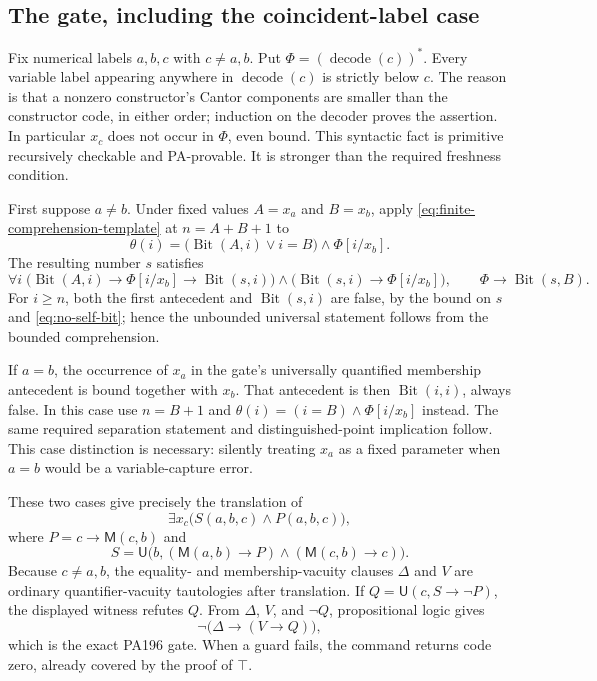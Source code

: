\subsection{The gate, including the coincident-label case}

Fix numerical labels $a,b,c$ with $c\ne a,b$. Put
$\Phi=(\operatorname{decode}(c))^*$. Every variable label appearing
anywhere in $\operatorname{decode}(c)$ is strictly below $c$.
The reason is that a nonzero constructor's Cantor components are smaller
than the constructor code, in either order; induction on the decoder
proves the assertion. In particular $x_c$ does not occur in $\Phi$, even
bound. This syntactic fact is primitive recursively checkable and
PA-provable. It is stronger than the required freshness condition.

First suppose $a\ne b$. Under fixed values $A=x_a$ and $B=x_b$, apply
\eqref{eq:finite-comprehension-template} at $n=A+B+1$ to
\[
  \theta(i)=
  \bigl(\operatorname{Bit}(A,i)\lor i=B\bigr)
  \land \Phi[i/x_b].
\]
The resulting number $s$ satisfies
\[
 \forall i\;
   \bigl(\operatorname{Bit}(A,i)\to\Phi[i/x_b]
                 \to\operatorname{Bit}(s,i)\bigr)
   \land\bigl(\operatorname{Bit}(s,i)\to\Phi[i/x_b]\bigr),
 \qquad
 \Phi\to\operatorname{Bit}(s,B).
\]
For $i\ge n$, both the first antecedent and $\operatorname{Bit}(s,i)$
are false, by the bound on $s$ and \eqref{eq:no-self-bit}; hence the
unbounded universal statement follows from the bounded comprehension.

If $a=b$, the occurrence of $x_a$ in the gate's universally quantified
membership antecedent is bound together with $x_b$. That antecedent is
then $\operatorname{Bit}(i,i)$, always false. In this case use
$n=B+1$ and $\theta(i)=(i=B)\land\Phi[i/x_b]$ instead. The same required
separation statement and distinguished-point implication follow. This
case distinction is necessary: silently treating $x_a$ as a fixed
parameter when $a=b$ would be a variable-capture error.

These two cases give precisely the translation of
\[
   \exists x_c\bigl(S(a,b,c)\land P(a,b,c)\bigr),
\]
where $P=c\to\mathsf M(c,b)$ and
\[
  S=\mathsf U\bigl(b,
      (\mathsf M(a,b)\to P)\land(\mathsf M(c,b)\to c)\bigr).
\]
Because $c\ne a,b$, the equality- and membership-vacuity clauses
$\Delta$ and $V$ are ordinary quantifier-vacuity tautologies after
translation. If $Q=\mathsf U(c,S\to\neg P)$, the displayed witness
refutes $Q$. From $\Delta$, $V$, and $\neg Q$, propositional logic gives
\[
   \neg\bigl(\Delta\to(V\to Q)\bigr),
\]
which is the exact PA196 gate. When a guard fails, the command returns
code zero, already covered by the proof of $\top$.

